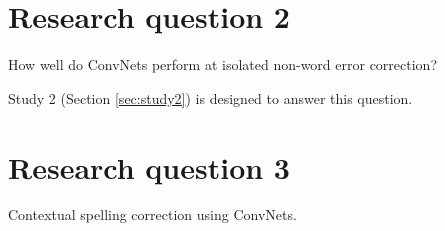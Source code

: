 \section{Research question 2}
\label{sec:question2}

How well do ConvNets perform at isolated non-word error correction?






Study 2 (Section \ref{sec:study2}) is designed to answer this question.

\section{Research question 3}
\label{sec:question2}

Contextual spelling correction using ConvNets. 



